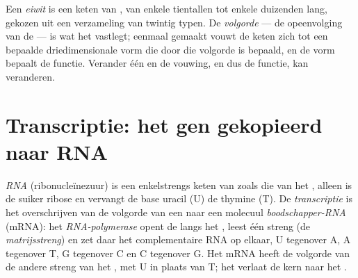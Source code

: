 \begin{definition}\label{def:g11:gene-expression:protein}
Een \emph{eiwit} is een keten van , van enkele
tientallen tot enkele duizenden lang, gekozen uit een verzameling van
twintig typen. De \emph{volgorde} --- de opeenvolging van de
 --- is wat het  vastlegt; eenmaal gemaakt vouwt de keten
zich tot een bepaalde driedimensionale vorm die door die volgorde is
bepaald, en de vorm bepaalt de functie. Verander één  en de
vouwing, en dus de functie, kan veranderen.
\end{definition}

\section{Transcriptie: het gen gekopieerd naar RNA}

\begin{definition}\label{def:g11:gene-expression:transcription}
\emph{RNA} (ribonucleïnezuur) is een enkelstrengs keten van
 zoals die van het , alleen is de suiker ribose en vervangt
de base uracil (U) de thymine (T). De \emph{transcriptie}
is het overschrijven van de volgorde van een  naar een molecuul
\emph{boodschapper-RNA} (mRNA): het 
\emph{RNA-polymerase} opent de  langs het , leest één
streng (de \emph{matrijsstreng}) en zet daar het complementaire RNA op
elkaar, U tegenover A, A tegenover T, G tegenover C en C tegenover G. Het
mRNA heeft de volgorde van de andere streng van het , met U in plaats
van T; het verlaat de kern naar het .
\end{definition}

